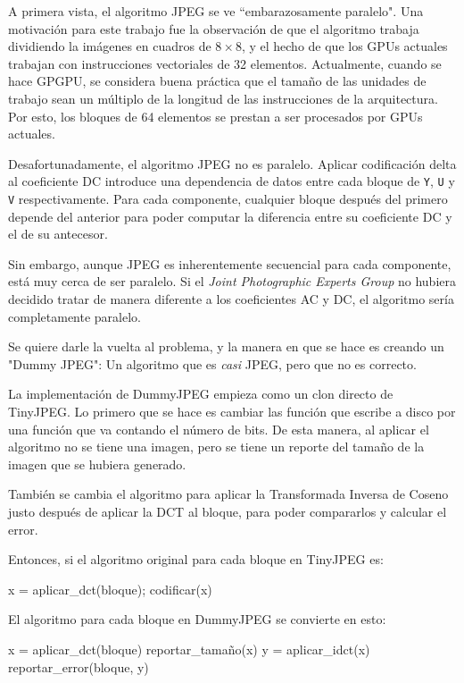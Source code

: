 A primera vista, el algoritmo JPEG se ve ``embarazosamente paralelo". Una
motivación para este trabajo fue la observación de que el algoritmo trabaja
dividiendo la imágenes en cuadros de $8\times8$, y el hecho de que los GPUs
actuales trabajan con instrucciones vectoriales de 32 elementos. Actualmente,
cuando se hace \gls{GPGPU}, se considera buena práctica que el tamaño de las
unidades de trabajo sean un múltiplo de la longitud de las instrucciones de la
arquitectura. Por esto, los bloques de 64 elementos se prestan a ser procesados
por GPUs actuales.

Desafortunadamente, el algoritmo JPEG no es paralelo. Aplicar codificación
delta al coeficiente DC introduce una dependencia de datos entre cada bloque de
\verb+Y+, \verb+U+ y \verb+V+ respectivamente. Para cada componente, cualquier
bloque después del primero depende del anterior para poder computar la
diferencia entre su coeficiente DC  y el de su antecesor.

Sin embargo, aunque JPEG es inherentemente secuencial para cada componente,
está muy cerca de ser paralelo. Si el \emph{Joint Photographic Experts Group}
no hubiera decidido tratar de manera diferente a los \gls{coeficientes AC} y DC, el
algoritmo sería completamente paralelo.

Se quiere darle la vuelta al problema, y la manera en que se hace es creando
un "Dummy JPEG": Un algoritmo que es \emph{casi} JPEG, pero que no es correcto.

La implementación de DummyJPEG empieza como un clon directo de TinyJPEG. Lo
primero que se hace es cambiar las función que escribe a disco por una función
que va contando el número de bits. De esta manera, al aplicar el algoritmo no
se tiene una imagen, pero se tiene un reporte del tamaño de la imagen que
se hubiera generado.

También se cambia el algoritmo para aplicar la Transformada Inversa de Coseno
justo después de aplicar la DCT al bloque, para poder compararlos y calcular el
error.

Entonces, si el algoritmo original para cada bloque en TinyJPEG es:

\begin{code}
    x = aplicar_dct(bloque);
    codificar(x)
\end{code}

El algoritmo para cada bloque en DummyJPEG se convierte en esto:

\begin{code}
    x = aplicar_dct(bloque)
    reportar_tamaño(x)
    y = aplicar_idct(x)
    reportar_error(bloque, y)
\end{code}

